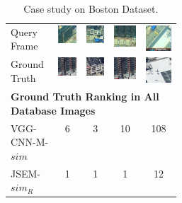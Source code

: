 \begin{table}[htbp]
\begin{tabular}{p{0.28\linewidth}|c|c|c|c}
Query Frame & 
\includegraphics[width=0.13\linewidth]{img/case_1} &
\includegraphics[width=0.13\linewidth]{img/case_2} &
\includegraphics[width=0.13\linewidth]{img/case_3} &
\includegraphics[width=0.13\linewidth]{img/case_4} \\
Ground Truth & 
\includegraphics[width=0.13\linewidth]{img/case_1_grnd} &
\includegraphics[width=0.13\linewidth]{img/case_2_grnd} &
\includegraphics[width=0.13\linewidth]{img/case_3_grnd} &
\includegraphics[width=0.13\linewidth]{img/case_4_grnd} \\
\hline
\multicolumn{5}{l}{\textbf{Ground Truth Ranking in All Database Images}} \\
\hline
VGG-CNN-M-$sim$ & 6 & 3 & 10 & 108\\
JSEM-$sim_R$ & 1 & 1 & 1 & 12\\
\end{tabular}
\caption{Case study on Boston Dataset.}
\label{table:bostoncase}
\end{table}

